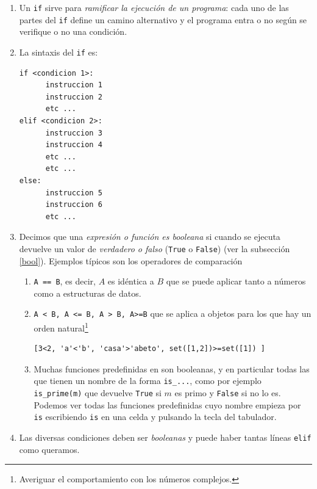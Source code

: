 \begin{enumerate}
 \item Un \lstinline|if| sirve para \emph{ramificar la ejecución de un
programa}:
cada uno de las partes del \lstinline|if| define un camino alternativo y el
programa
entra o no según se verifique o no una condición.

\item La sintaxis del \lstinline|if| es:
 
\begin{lstlisting}
if <condicion 1>:
      instruccion 1
      instruccion 2
      etc ...
elif <condicion 2>:
      instruccion 3
      instruccion 4
      etc ...
      etc ...
else:
      instruccion 5
      instruccion 6
      etc ...
\end{lstlisting}

\item Decimos que una {\itshape expresión o función es booleana} si cuando
se ejecuta devuelve un valor de {\itshape verdadero o falso}
({\tt True} o {\tt False}) (ver la subsecci\'on \ref{bool}). Ejemplos típicos 
son
los operadores de
comparación
\begin{enumerate}
\item \lstinline|A == B|, es decir,  $A$ es idéntica a $B$ que se puede aplicar
tanto a números como a estructuras de datos. 

\item \lstinline|A < B, A <= B, A > B, A>=B| que se aplica a objetos para los
que 
hay un orden natural\footnote{Averiguar el comportamiento con los números
complejos.}
\begin{lstlisting}
[3<2, 'a'<'b', 'casa'>'abeto', set([1,2])>=set([1]) ]
\end{lstlisting}
\begin{Output}
\end{Output}


\item Muchas funciones predefinidas en {\sage} son booleanas, y en particular
todas
las que tienen un nombre de la forma {\tt is\_...}, como por ejemplo 
\lstinline|is_prime(m)| que devuelve {\tt True} si $m$ es primo y {\tt False} si
no lo es. Podemos ver todas las funciones predefinidas cuyo nombre empieza por
{\tt
is} escribiendo {\tt is} en una celda y pulsando la tecla del tabulador.
\end{enumerate}

\item Las diversas condiciones deben ser {\itshape booleanas} y puede haber
tantas líneas \lstinline|elif| como queramos.  


\end{enumerate}
